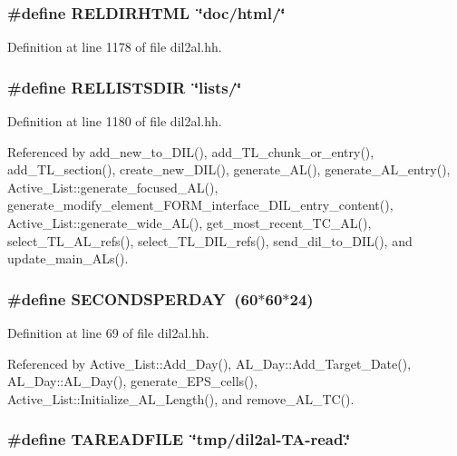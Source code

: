 \subsubsection{\setlength{\rightskip}{0pt plus 5cm}\#define RELDIRHTML\ \char`\"{}doc/html/\char`\"{}}\label{dil2al_8hh_a32}




Definition at line 1178 of file dil2al.hh.
\subsubsection{\setlength{\rightskip}{0pt plus 5cm}\#define RELLISTSDIR\ \char`\"{}lists/\char`\"{}}\label{dil2al_8hh_a34}




Definition at line 1180 of file dil2al.hh.

Referenced by add\_\-new\_\-to\_\-DIL(), add\_\-TL\_\-chunk\_\-or\_\-entry(), add\_\-TL\_\-section(), create\_\-new\_\-DIL(), generate\_\-AL(), generate\_\-AL\_\-entry(), Active\_\-List::generate\_\-focused\_\-AL(), generate\_\-modify\_\-element\_\-FORM\_\-interface\_\-DIL\_\-entry\_\-content(), Active\_\-List::generate\_\-wide\_\-AL(), get\_\-most\_\-recent\_\-TC\_\-AL(), select\_\-TL\_\-AL\_\-refs(), select\_\-TL\_\-DIL\_\-refs(), send\_\-dil\_\-to\_\-DIL(), and update\_\-main\_\-ALs().
\subsubsection{\setlength{\rightskip}{0pt plus 5cm}\#define SECONDSPERDAY\ (60$\ast$60$\ast$24)}\label{dil2al_8hh_a4}




Definition at line 69 of file dil2al.hh.

Referenced by Active\_\-List::Add\_\-Day(), AL\_\-Day::Add\_\-Target\_\-Date(), AL\_\-Day::AL\_\-Day(), generate\_\-EPS\_\-cells(), Active\_\-List::Initialize\_\-AL\_\-Length(), and remove\_\-AL\_\-TC().
\subsubsection{\setlength{\rightskip}{0pt plus 5cm}\#define TAREADFILE\ \char`\"{}tmp/dil2al-TA-read.\char`\"{}}\label{dil2al_8hh_a66}




